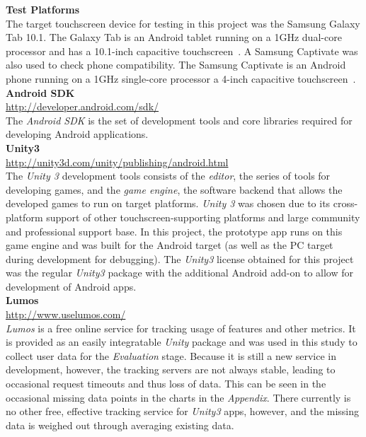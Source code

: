 \documentclass{sig-alternate}
\begin{document}
\noindent \textbf{Test Platforms} \\
The target touchscreen device for testing in this project was the Samsung Galaxy Tab 10.1. The Galaxy Tab is an Android tablet running on a 1GHz dual-core processor and has a 10.1-inch capacitive touchscreen~\cite{galaxy_tab}. A Samsung Captivate was also used to check phone compatibility. The Samsung Captivate is an Android phone running on a 1GHz single-core processor a 4-inch capacitive touchscreen~\cite{samsung_captivate}.\\

\noindent \textbf{Android SDK} \\
\url{http://developer.android.com/sdk/} \\
The \textit{Android SDK} is the set of development tools and core libraries required for developing Android applications. \\

\noindent \textbf{Unity3} \\
\url{http://unity3d.com/unity/publishing/android.html} \\
The \textit{Unity 3} development tools consists of the \textit{editor}, the series of tools for developing games, and the \textit{game engine}, the software backend that allows the developed games to run on target platforms. \textit{Unity 3} was chosen due to its cross-platform support of other touchscreen-supporting platforms and large community and professional support base. In this project, the prototype app runs on this game engine and was built for the Android target (as well as the PC target during development for debugging). The \textit{Unity3} license obtained for this project was the regular \textit{Unity3} package with the additional Android add-on to allow for development of Android apps. \\

\noindent \textbf{Lumos} \\
\url{http://www.uselumos.com/} \\
\textit{Lumos} is a free online service for tracking usage of features and other metrics. It is provided as an easily integratable \textit{Unity} package and was used in this study to collect user data for the \textit{Evaluation} stage. Because it is still a new service in development, however, the tracking servers are not always stable, leading to occasional request timeouts and thus loss of data. This can be seen in the occasional missing data points in the charts in the \textit{Appendix}. There currently is no other free, effective tracking service for \textit{Unity3} apps, however, and the missing data is weighed out through averaging existing data. \\
\end{document}
